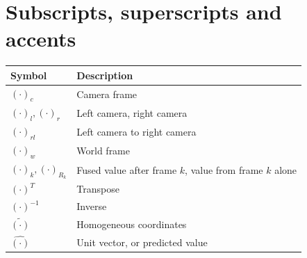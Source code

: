 \section*{Subscripts, superscripts and accents}
\noindent
\begin{tabularx}{\textwidth}{@{}l X@{}}
\toprule
\textbf{Symbol} & \textbf{Description} \\
\midrule
$(\cdot)_c$                & Camera frame \\
$(\cdot)_l, (\cdot)_r$     & Left camera, right camera \\
$(\cdot)_{rl}$             & Left camera to right camera \\
$(\cdot)_w$                & World frame \\
$(\cdot)_k, (\cdot)_{R_k}$ & Fused value after frame $k$, value from frame $k$ alone \\
$(\cdot)^T$                & Transpose \\
$(\cdot)^{-1}$             & Inverse \\
$\tilde{(\cdot)}$          & Homogeneous coordinates \\
$\hat{(\cdot)}$            & Unit vector, or predicted value \\
\bottomrule
\end{tabularx}
